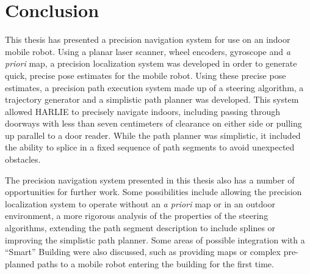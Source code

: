\section{Conclusion}\label{sec:conclusion}

This thesis has presented a precision navigation system for use on an indoor mobile robot. Using a planar laser scanner, wheel encoders, gyroscope and \emph{a priori} map, a precision localization system was developed in order to generate quick, precise pose estimates for the mobile robot. Using these precise pose estimates, a precision path execution system made up of a steering algorithm, a trajectory generator and a simplistic path planner was developed. This system allowed HARLIE to precisely navigate indoors, including passing through doorways with less than seven centimeters of clearance on either side or pulling up parallel to a door reader. While the path planner was simplistic, it included the ability to splice in a fixed sequence of path segments to avoid unexpected obstacles.

The precision navigation system presented in this thesis also has a number of opportunities for further work. Some possibilities include allowing the precision localization system to operate without an \emph{a priori} map or in an outdoor environment, a more rigorous analysis of the properties of the steering algorithms, extending the path segment description to include splines or improving the simplistic path planner. Some areas of possible integration with a ``Smart'' Building were also discussed, such as providing maps or complex pre-planned paths to a mobile robot entering the building for the first time.